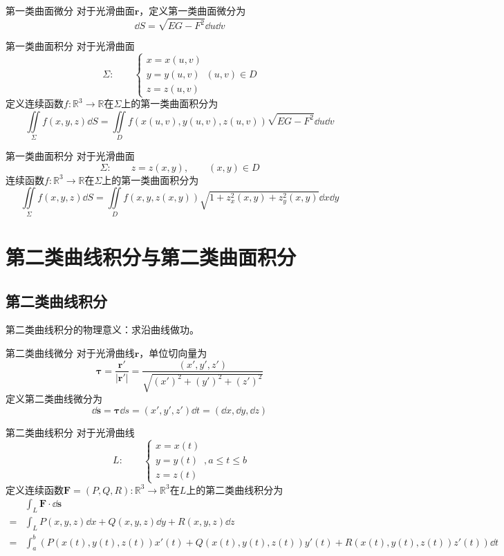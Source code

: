 \documentclass[lang = cn, scheme = chinese, thmcnt = section]{elegantbook}
\newcommand{\R}{\mathbb{R}}            %
\newcommand{\bs}{\boldsymbol}          %
\newcommand{\IInt}{\iint\limits}
\begin{document}
\begin{definition}{第一类曲面微分}
	对于光滑曲面$\bs{r}$，定义第一类曲面微分为
	$$
	\dd S=\sqrt{EG-F^2}\dd u\dd v
	$$
\end{definition}

\begin{theorem}{第一类曲面积分}
	对于光滑曲面
	$$
	\Sigma:\qquad
	\begin{cases}
		x=x(u,v)\\
		y=y(u,v)\\
		z=z(u,v)
	\end{cases}(u,v)\in D
	$$
	定义连续函数$f:\R^3\to\R$在$\Sigma$上的第一类曲面积分为
	$$
	\IInt_\Sigma f(x,y,z)\dd S
	=\IInt_D f(x(u,v),y(u,v),z(u,v))\sqrt{EG-F^2}\dd u\dd v
	$$
\end{theorem}

\begin{corollary}{第一类曲面积分}
	对于光滑曲面
	$$
	\Sigma:\qquad z=z(x,y),\qquad (x,y)\in D
	$$
	连续函数$f:\R^3\to\R$在$\Sigma$上的第一类曲面积分为
	$$
	\IInt_\Sigma f(x,y,z)\dd S
	=\IInt_D f(x,y,z(x,y))\sqrt{1+z_x^2(x,y)+z_y^2(x,y)}\dd x\dd y
	$$
\end{corollary}

\section{第二类曲线积分与第二类曲面积分}

\subsection{第二类曲线积分}

\begin{note}
	第二类曲线积分的物理意义：求沿曲线做功。
\end{note}

\begin{definition}{第二类曲线微分}
	对于光滑曲线$\bs{r}$，单位切向量为
	$$
	\bs{\tau}
	=\frac{\bs{r}'}{|\bs{r}'|}
	=\frac{(x',y',z')}{\sqrt{(x')^2+(y')^2+(z')^2}}
	$$
	定义第二类曲线微分为
	$$
	\dd \bs{s}=
	\bs{\tau}\dd s
	=(x',y',z')\dd t
	=(\dd x,\dd y,\dd z)
	$$
\end{definition}

\begin{theorem}{第二类曲线积分}
	对于光滑曲线
	$$
	L:\qquad \begin{cases}
		x=x(t)\\
		y=y(t)\\
		z=z(t)
	\end{cases},a\le t\le b
	$$
	定义连续函数$\bs{F}=(P,Q,R):\R^3\to\R^3$在$L$​上的第二类曲线积分为
	\begin{align*}
		& \int_L \bs{F}\cdot \dd \bs{s}\\
		=&\int_L P(x,y,z)\dd x+Q(x,y,z)\dd y+R(x,y,z)\dd z\\
		=&\int_{a}^{b}\left(P(x(t),y(t),z(t))x'(t)+Q(x(t),y(t),z(t))y'(t)+R(x(t),y(t),z(t))z'(t)\right)\dd t
	\end{align*}
\end{theorem}
\end{document}
